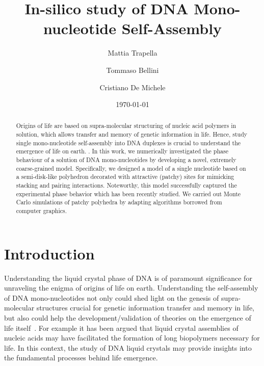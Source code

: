 \documentclass[aip,jcp, amsmath, amssymb, reprint]{revtex4-1}
\begin{document}
\title{In-silico study of DNA Mono-nucleotide Self-Assembly}
\date{\today}

\author{Mattia Trapella}

\author{Tommaso Bellini}
\author{Cristiano De Michele}

\begin{abstract}
  Origins of life are based on supra-molecular structuring
  of nucleic acid polymers in solution, which allows transfer and memory of genetic information in life. 
  Hence, study single mono-nucleotide self-assembly into DNA duplexes is crucial to understand 
  the emergence of life on earth.
 . %
  In this work, we numerically investigated the phase behaviour of a solution of DNA
  mono-nucleotides by developing a novel, extremely coarse-grained model. Specifically, 
  we designed a model of a single nucleotide based on a semi-disk-like polyhedron decorated with attractive 
  (patchy) sites for mimicking stacking and pairing interactions. Noteworthy, 
  this model successfully captured the experimental phase behavior which has been recently studied.
  We carried out Monte Carlo simulations of patchy polyhedra by adapting algorithms borrowed 
  from computer graphics.%
\end{abstract}

\maketitle


\section{Introduction}
Understanding the liquid crystal phase of DNA is of paramount significance for unraveling the enigma of origins of life
on earth. Understanding the self-assembly of DNA mono-nucleotides not only could shed light on the genesis of 
supra-molecular structures crucial for genetic information transfer and memory in life, but also could help the 
development/validation of theories on the emergence of life itself~\cite{Jia}. 
For example it has been argued that  liquid crystal assemblies of nucleic acids may have facilitated the formation 
of long biopolymers necessary for life. In this context, the study of DNA liquid crystals may provide 
insights into the fundamental processes behind life emergence.  \\
\end{document}
